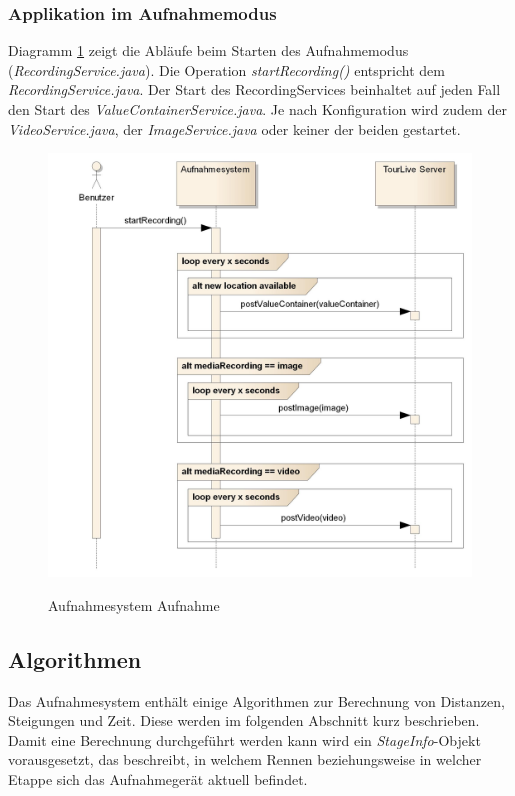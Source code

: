 \subsubsection{Applikation im Aufnahmemodus}
Diagramm \ref{fig:recording} zeigt die Abläufe beim Starten des Aufnahmemodus (\textit{RecordingService.java}). Die Operation \textit{startRecording()} entspricht dem \textit{RecordingService.java}. Der Start des RecordingServices beinhaltet auf jeden Fall den Start des  \textit{ValueContainerService.java}. Je nach Konfiguration wird zudem der \textit{VideoService.java}, der \textit{ImageService.java} oder keiner der beiden gestartet.

\begin{figure}[H]
	\centering
	\includegraphics[width=150mm]{images/android/recording.jpg}
	\label{fig:recording}
	\caption{Aufnahmesystem Aufnahme}
\end{figure}

\subsection{Algorithmen}
Das Aufnahmesystem enthält einige Algorithmen zur Berechnung von Distanzen, Steigungen und Zeit. Diese werden im folgenden Abschnitt kurz beschrieben. Damit eine Berechnung durchgeführt werden kann wird ein \textit{StageInfo}-Objekt vorausgesetzt, das beschreibt, in welchem Rennen beziehungsweise in welcher Etappe sich das Aufnahmegerät aktuell befindet.
\\

